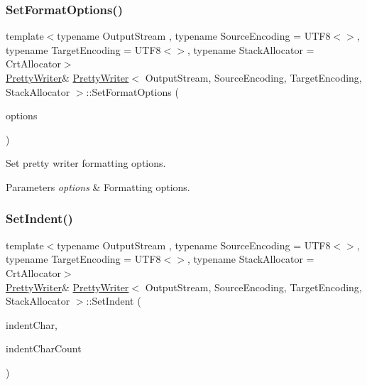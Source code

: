 \subsubsection{\texorpdfstring{Set\+Format\+Options()}{SetFormatOptions()}}
{\footnotesize\ttfamily template$<$typename Output\+Stream , typename Source\+Encoding  = U\+T\+F8$<$$>$, typename Target\+Encoding  = U\+T\+F8$<$$>$, typename Stack\+Allocator  = Crt\+Allocator$>$ \\
\hyperlink{classPrettyWriter}{Pretty\+Writer}\& \hyperlink{classPrettyWriter}{Pretty\+Writer}$<$ Output\+Stream, Source\+Encoding, Target\+Encoding, Stack\+Allocator $>$\+::Set\+Format\+Options (\begin{DoxyParamCaption}\item[{Pretty\+Format\+Options}]{options }\end{DoxyParamCaption})\hspace{0.3cm}{\ttfamily [inline]}}



Set pretty writer formatting options. 


\begin{DoxyParams}{Parameters}
{\em options} & Formatting options. \\
\hline
\end{DoxyParams}
\mbox{\label{classPrettyWriter_afe3a560009b5cd6a79a1e91c807387ad}} 
\subsubsection{\texorpdfstring{Set\+Indent()}{SetIndent()}\hspace{0.1cm}{\footnotesize\ttfamily [1/2]}}
{\footnotesize\ttfamily template$<$typename Output\+Stream , typename Source\+Encoding  = U\+T\+F8$<$$>$, typename Target\+Encoding  = U\+T\+F8$<$$>$, typename Stack\+Allocator  = Crt\+Allocator$>$ \\
\hyperlink{classPrettyWriter}{Pretty\+Writer}\& \hyperlink{classPrettyWriter}{Pretty\+Writer}$<$ Output\+Stream, Source\+Encoding, Target\+Encoding, Stack\+Allocator $>$\+::Set\+Indent (\begin{DoxyParamCaption}\item[{Ch}]{indent\+Char,  }\item[{unsigned}]{indent\+Char\+Count }\end{DoxyParamCaption})\hspace{0.3cm}{\ttfamily [inline]}}



